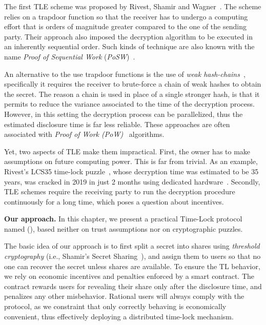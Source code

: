 The first TLE scheme was proposed by Rivest, Shamir and Wagner~\cite{Rivest:1996:TPT:888615}.
The scheme relies on a trapdoor function so that the receiver has to undergo a computing effort that is orders of magnitude greater compared to the one of the sending party. Their approach also imposed the decryption algorithm to be executed in an inherently sequential order.
Such kinds of technique are also known with the name {\em Proof of Sequential Work} ({\em PoSW})~\cite{posw,cohen2018}.

An alternative to the use trapdoor functions is the use of {\em weak hash-chains}~\cite{gwern}, specifically it requires the receiver to brute-force a chain of weak hashes to obtain the secret.
The reason a chain is used in place of a single stronger hash, is that it permits to reduce the variance associated to the time of the decryption process. 
However, in this setting the decryption process can be parallelized, thus the estimated disclosure time is far less reliable.
These approaches are often associated with {\em Proof of Work (PoW)}~\cite{pow} algorithms.

Yet, two aspects of TLE make them impractical. First,
%
the owner has to make assumptions on future computing power. 
This is far from trivial.
As an example, Rivest's LCS35 time-lock puzzle~\cite{lcs35}, whose decryption time was estimated to be 35 years, was cracked in 2019 in just 2 months using dedicated hardware~\cite{lcs35-crack-open}.
%
Secondly, TLE schemes require the receiving party to run the decryption procedure continuously for a long time, which poses a question about incentives.


\medskip\textbf{Our approach.} In this chapter, we present a practical Time-Lock protocol named {\em \name} ({\em \shortname}), based neither on trust assumptions nor on cryptographic puzzles.

The basic idea of our approach is to first split a secret into shares using {\em threshold cryptography} (i.e., Shamir's Secret Sharing~\cite{Shamir:1979:SS:359168.359176}), and assign them to users so that no one can recover the secret unless \KofN shares are available.
To ensure the TL behavior, we rely on economic incentives and penalties enforced by a smart contract.
The contract rewards users for revealing their share only after the disclosure time, and penalizes any other misbehavior.
Rational users will always comply with the protocol, as we constraint that only correctly behaving is economically convenient, thus effectively deploying a distributed time-lock mechanism.

